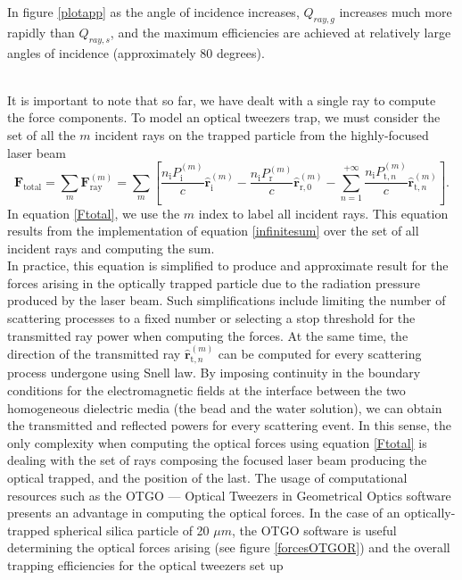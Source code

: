 \documentclass[letterpaper,12pt,oneside]{book}
\begin{document}
In figure \ref{plotapp} as the angle of incidence increases, $Q_{ray,g}$ increases much more rapidly than $Q_{ray,s}$, and the maximum efficiencies are achieved at relatively large angles of incidence (approximately 80 degrees).


\\It is important to note that so far, we have dealt with a single ray to compute the force components. To model an optical tweezers trap, we must consider the set of all the $m$ incident rays on the trapped particle from the highly-focused laser beam
\begin{equation}
\mathbf{F}_{\mathrm{total}}=\sum_m \mathbf{F}_{\mathrm{ray}}^{(m)}=\sum_m\left[\frac{n_{\mathrm{i}} P_{\mathrm{i}}^{(m)}}{c} \hat{\mathbf{r}}_{\mathrm{i}}^{(m)}-\frac{n_{\mathrm{i}} P_{\mathrm{r}}^{(m)}}{c} \hat{\mathbf{r}}_{\mathrm{r}, 0}^{(m)}-\sum_{n=1}^{+\infty} \frac{n_{\mathrm{i}} P_{\mathrm{t}, n}^{(m)}}{c} \hat{\mathbf{r}}_{\mathrm{t}, n}^{(m)}\right]. 
\label{Ftotal}
\end{equation}
In equation \eqref{Ftotal}, we use the $m$ index to label all incident rays. This equation results from the implementation of equation \eqref{infinitesum} over the set of all incident rays and computing the sum. \\ In practice, this equation is simplified to produce and approximate result for the forces arising in the optically trapped particle due to the radiation pressure produced by the laser beam.
Such simplifications include limiting the number of scattering processes to a fixed number or selecting a stop threshold for the transmitted ray power when computing the forces. At the same time, the direction of the transmitted ray $\hat{\mathbf{r}}_{\mathrm{t}, n}^{(m)}$ can be computed for every scattering process undergone using Snell law. By imposing continuity in the boundary conditions for the electromagnetic fields at the interface between the two homogeneous dielectric media (the bead and the water solution), we can obtain the transmitted and reflected powers for every scattering event. In this sense, the only complexity when computing the optical forces using equation \eqref{Ftotal} is dealing with the set of rays composing the focused laser beam producing the optical trapped, and the position of the last. The usage of computational resources such as the OTGO — Optical Tweezers in Geometrical Optics software presents an advantage in computing the optical forces.
In the case of an optically-trapped  spherical silica particle of 20 $\mu m$, the OTGO software is useful determining the optical forces arising (see figure \ref{forcesOTGOR}) and the overall trapping efficiencies for the optical tweezers set up
\end{document}
